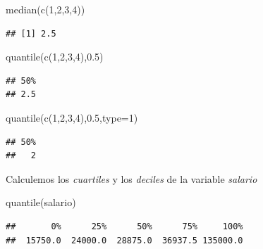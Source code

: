 \documentclass[
]{book}
\newenvironment{Shaded}{\begin{snugshade}}{\end{snugshade}}
\newcommand{\AttributeTok}[1]{\textcolor[rgb]{0.77,0.63,0.00}{#1}}
\newcommand{\DecValTok}[1]{\textcolor[rgb]{0.00,0.00,0.81}{#1}}
\newcommand{\FloatTok}[1]{\textcolor[rgb]{0.00,0.00,0.81}{#1}}
\newcommand{\FunctionTok}[1]{\textcolor[rgb]{0.00,0.00,0.00}{#1}}
\newcommand{\NormalTok}[1]{#1}
\theoremstyle{break}
\theoremstyle{nonumberplain}
\begin{document}
\begin{Shaded}
\begin{Highlighting}[]
\FunctionTok{median}\NormalTok{(}\FunctionTok{c}\NormalTok{(}\DecValTok{1}\NormalTok{,}\DecValTok{2}\NormalTok{,}\DecValTok{3}\NormalTok{,}\DecValTok{4}\NormalTok{))}
\end{Highlighting}
\end{Shaded}

\begin{verbatim}
## [1] 2.5
\end{verbatim}

\begin{Shaded}
\begin{Highlighting}[]
\FunctionTok{quantile}\NormalTok{(}\FunctionTok{c}\NormalTok{(}\DecValTok{1}\NormalTok{,}\DecValTok{2}\NormalTok{,}\DecValTok{3}\NormalTok{,}\DecValTok{4}\NormalTok{),}\FloatTok{0.5}\NormalTok{)}
\end{Highlighting}
\end{Shaded}

\begin{verbatim}
## 50% 
## 2.5
\end{verbatim}

\begin{Shaded}
\begin{Highlighting}[]
\FunctionTok{quantile}\NormalTok{(}\FunctionTok{c}\NormalTok{(}\DecValTok{1}\NormalTok{,}\DecValTok{2}\NormalTok{,}\DecValTok{3}\NormalTok{,}\DecValTok{4}\NormalTok{),}\FloatTok{0.5}\NormalTok{,}\AttributeTok{type=}\DecValTok{1}\NormalTok{)}
\end{Highlighting}
\end{Shaded}

\begin{verbatim}
## 50% 
##   2
\end{verbatim}

Calculemos los \emph{cuartiles} y los \emph{deciles} de la variable \emph{salario}

\begin{Shaded}
\begin{Highlighting}[]
\FunctionTok{quantile}\NormalTok{(salario)}
\end{Highlighting}
\end{Shaded}

\begin{verbatim}
##       0%      25%      50%      75%     100% 
##  15750.0  24000.0  28875.0  36937.5 135000.0
\end{verbatim}
\end{document}

